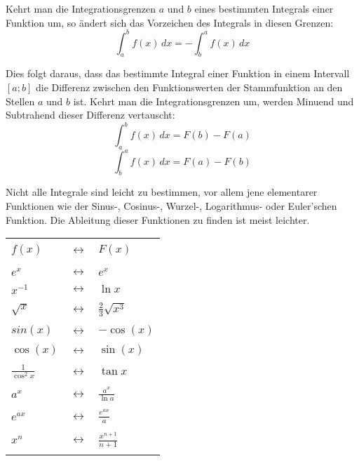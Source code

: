 \begin{itemize}

	Kehrt man die Integrationsgrenzen $a$ und $b$ eines bestimmten Integrals einer Funktion um, so \"{a}ndert sich das Vorzeichen des Integrals in diesen Grenzen: $$\int_a^b f(x) \, dx = -\int_b^a f(x) \, dx$$

	Dies folgt daraus, dass das bestimmte Integral einer Funktion in einem Intervall $[a ; b]$ die Differenz zwischen den Funktionswerten der Stammfunktion an den Stellen $a$ und $b$ ist. Kehrt man die Integrationsgrenzen um, werden Minuend und Subtrahend dieser Differenz vertauscht: $$\int_a^b f(x) \, dx = F(b) - F(a)$$ $$\int_b^a f(x) \, dx = F(a) - F(b)$$

\end{itemize}

\pagebreak


Nicht alle Integrale sind leicht zu bestimmen, vor allem jene elementarer Funktionen wie der Sinus-, Cosinus-, Wurzel-, Logarithmus- oder Euler'schen Funktion. Die Ableitung dieser Funktionen zu finden ist meist leichter.

\vspace{\parskip}

\begin{table}[h!]
	\centering
	\large
	\begin{tabular}{| >{\centering\arraybackslash}p{1.5cm}
	 				  c
	 				  >{\centering\arraybackslash}p{1.5cm} |}
		\hline
		&& \\
		$f(x)$ & $\longleftrightarrow$ & $F(x)$
		\\ && \\ \hline && \\
		$e^x$ & $\longleftrightarrow$ & $e^x$
		\\ && \\
		$x^{-1}$ & $\longleftrightarrow$ & $\ln x$
		\\ && \\
		$\sqrt{x}$ & $\longleftrightarrow$ & $\frac{2}{3}\sqrt{x^3}$
		\\ && \\
		$sin(x)$ & $\longleftrightarrow$ & $-\cos(x)$
		\\ && \\
		$\cos(x)$ & $\longleftrightarrow$ & $\sin(x)$
		\\ && \\
		$\frac{1}{\cos^2 x}$ & $\longleftrightarrow$ & $\tan x$
		\\ && \\
		$a^x$ & $\longleftrightarrow$ & $\frac{a^x}{\ln a}$
		\\ && \\
		$e^{ax}$ & $\longleftrightarrow$ & $\frac{e^{ax}}{a}$
		\\ && \\
		$x^n$ & $\longleftrightarrow$ & $\frac{x^{n + 1}}{n + 1}$
		\\ && \\
		\hline
	\end{tabular}
\end{table}

